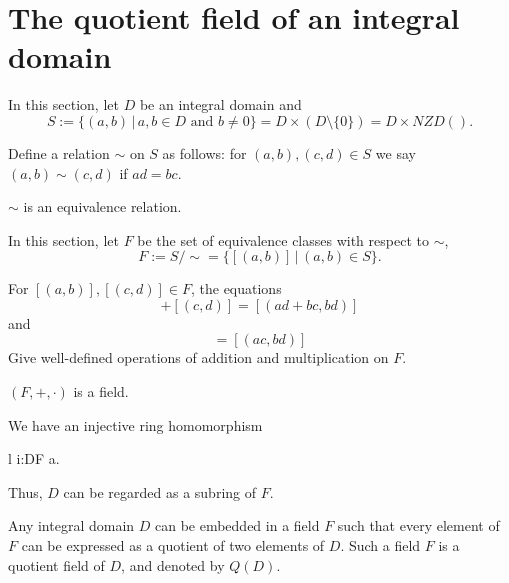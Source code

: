 \documentclass{article}
\begin{document}
\section{The quotient field of an integral domain}
\begin{rema}
	In this section, let \(D\) be an integral domain and
	\begin{equation*}
		S:=\{(a,b)\,|\,a,b\in D\text{ and }b\neq 0\}=D\times(D\setminus\{0\})=D\times NZD().
	\end{equation*}
\end{rema}
\begin{defi}
	Define a relation \(\sim\) on \(S\) as follows: for \((a,b),(c,d)\in S\) we say \((a,b)\sim(c,d)\) if \(ad=bc\).
\end{defi}
\begin{rema}
	\(\sim\) is an equivalence relation.
\end{rema}
\begin{defi}
	In this section, let \(F\) be the set of equivalence classes with respect to \(\sim\),
	\begin{equation*}
		F:=S/\sim=\{[(a,b)]\,|\,(a,b)\in S\}.
	\end{equation*}
\end{defi}
\begin{defi}
	For \([(a,b)],[(c,d)]\in F\), the equations
	\begin{equation*}
		[(a,b)]+[(c,d)]=[(ad+bc, bd)]
	\end{equation*}
	and
	\begin{equation*}
		[(a,b)][(c,d)]=[(ac,bd)]
	\end{equation*}
	Give well-defined operations of addition and multiplication on \(F\).
\end{defi}
\begin{thm}
	\((F,+,\cdot)\) is a field.
\end{thm}
\begin{lem}
	We have an injective ring homomorphism
	\begin{IEEEeqnarray*}{l}
		i:D\rightarrow F
		a\rightarrow[(a,1)].
	\end{IEEEeqnarray*}
	Thus, \(D\) can be regarded as a subring of \(F\).
\end{lem}
\begin{thm}
	Any integral domain \(D\) can be embedded in a field \(F\) such that every element of \(F\) can be expressed as a quotient of two elements of \(D\). Such a field \(F\) is a quotient field of \(D\), and denoted by \(Q(D)\).
\end{thm}
\end{document}

